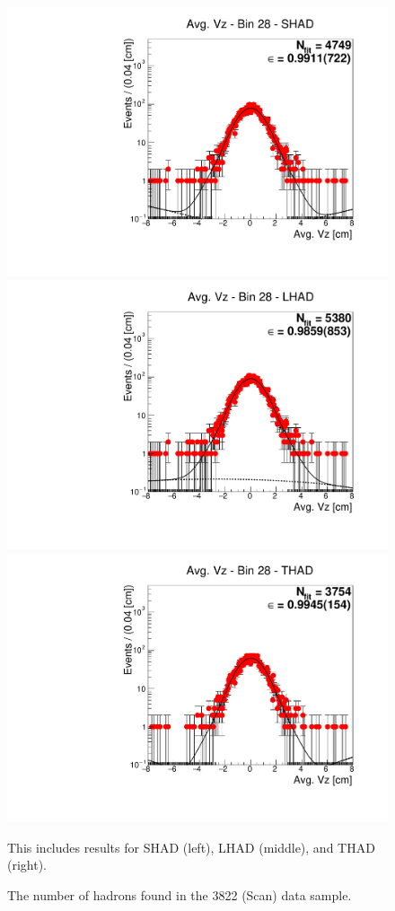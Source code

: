 \begin{figure}[H]
\centering
\includegraphics[scale=0.25]{figures/plots/nonDDbar_fit_results/scan/fit_scan_28_data_SHAD.pdf}
\hspace{-0.5cm}
\includegraphics[scale=0.25]{figures/plots/nonDDbar_fit_results/scan/fit_scan_28_data_LHAD.pdf}
\hspace{-0.5cm}
\includegraphics[scale=0.25]{figures/plots/nonDDbar_fit_results/scan/fit_scan_28_data_THAD.pdf}
\caption{The number of hadrons found in the 3822 (Scan) data sample.}
{This includes results for SHAD (left), LHAD (middle), and THAD (right).}
\label{fig:hadron_fits_scan_28}
\end{figure}

